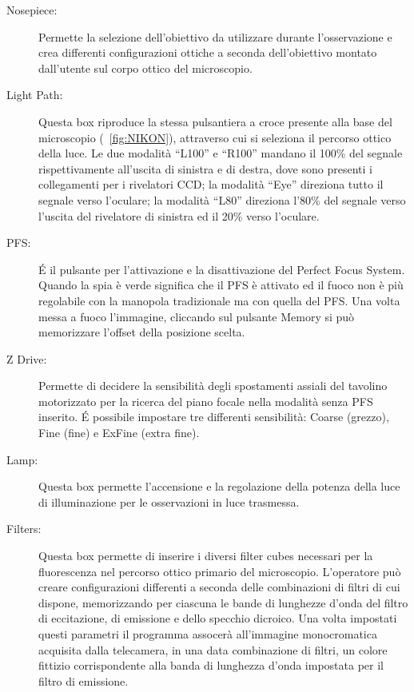 \begin{description}
\item[Nosepiece:]
Permette la selezione dell'obiettivo da utilizzare durante l'osservazione e crea differenti configurazioni ottiche a seconda dell'obiettivo montato dall'utente sul corpo ottico del microscopio.

\item[Light Path:]
Questa box riproduce la stessa pulsantiera a croce presente alla base del microscopio (\figurename~\ref{fig:NIKON}), attraverso cui si seleziona il percorso ottico della luce. 
Le due modalità ``L100'' e ``R100'' mandano il 100\% del segnale rispettivamente all'uscita di sinistra e di destra, dove sono presenti i collegamenti per i rivelatori CCD; la modalità ``Eye'' direziona tutto il segnale verso l'oculare; la modalità ``L80'' direziona l'80\% del segnale verso l'uscita del rivelatore di sinistra ed il 20\% verso l'oculare.

\item[PFS:]
\'E il pulsante per l'attivazione e la disattivazione del Perfect Focus System. 
Quando la spia è verde significa che il PFS è attivato ed il fuoco non è più regolabile con la manopola tradizionale ma con quella del PFS. 
Una volta messa a fuoco l'immagine, cliccando sul pulsante Memory si può memorizzare l'offset della posizione scelta.

\item[Z Drive:]
Permette di decidere la sensibilità degli spostamenti assiali del tavolino motorizzato per la ricerca del piano focale nella modalità senza PFS inserito.
\'E possibile impostare tre differenti sensibilità: Coarse (grezzo), Fine (fine) e ExFine (extra fine).

\item[Lamp:]
Questa box permette l'accensione e la regolazione della potenza della luce di illuminazione per le osservazioni in luce trasmessa.

\item[Filters:]
Questa box permette di inserire i diversi filter cubes necessari per la fluorescenza nel percorso ottico primario del microscopio.
L'operatore può creare configurazioni differenti a seconda delle combinazioni di filtri di cui dispone, memorizzando per ciascuna le bande di lunghezze d'onda del filtro di eccitazione, di emissione e dello specchio dicroico.
Una volta impostati questi parametri il programma assocerà all'immagine monocromatica acquisita dalla telecamera, in una data combinazione di filtri, un colore fittizio corrispondente alla banda di lunghezza d'onda impostata per il filtro di emissione.
\end{description}

